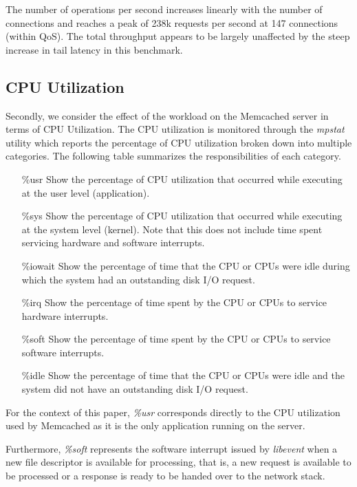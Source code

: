 The number of operations per second increases linearly with the number of connections and reaches a peak of 238k requests per second at 147 connections (within QoS). The total throughput appears to be largely unaffected by the steep increase in tail latency in this benchmark.


\subsection{CPU Utilization}

Secondly, we consider the effect of the workload on the Memcached server in terms of CPU Utilization. The CPU utilization is monitored through the \textit{mpstat} \cite{mpstat} utility which reports the percentage of CPU utilization broken down into multiple categories. The following table \cite{mpstat} summarizes the responsibilities of each category.

\begin{enumerate}
    \item [\%usr] Show the percentage of CPU utilization that occurred while executing at the user level (application).
    \item [\%sys] Show the percentage of CPU utilization that occurred while executing at the system level (kernel). Note that this does not include time spent servicing hardware and software interrupts.
    \item [\%iowait] Show the percentage of time that the CPU or CPUs were idle during which the system had an outstanding disk I/O request.
    \item [\%irq] Show the percentage of time spent by the CPU or CPUs to service hardware interrupts.
    \item [\%soft] Show the percentage of time spent by the CPU or CPUs to service software interrupts.
    \item [\%idle] Show the percentage of time that the CPU or CPUs were idle and the system did not have an outstanding disk I/O request.
\end{enumerate}

For the context of this paper, \textit{\%usr} corresponds directly to the CPU utilization used by Memcached as it is the only application running on the server.

Furthermore, \textit{\%soft} represents the software interrupt issued by \textit{libevent} when a new file descriptor is available for processing, that is, a new request is available to be processed or a response is ready to be handed over to the network stack.

